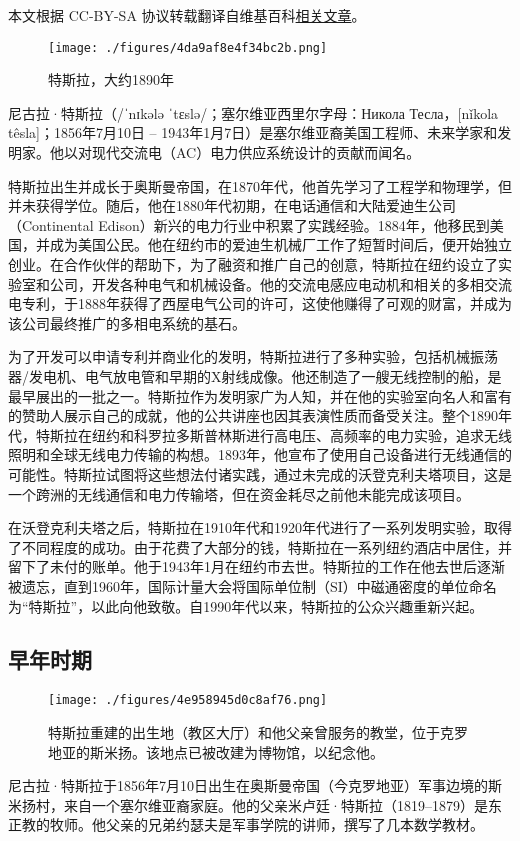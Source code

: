 
本文根据 CC-BY-SA 协议转载翻译自维基百科\href{https://en.wikipedia.org/wiki/Nikola_Tesla}{相关文章}。

\begin{figure}[ht]
\centering
\texttt{[image: ./figures/4da9af8e4f34bc2b.png]}
\caption{特斯拉，大约1890年} \label{fig_Tesla_1}
\end{figure}
尼古拉·特斯拉（/ˈnɪkələ ˈtɛslə/；塞尔维亚西里尔字母：Никола Тесла，[nǐkola têsla]；1856年7月10日 – 1943年1月7日）是塞尔维亚裔美国工程师、未来学家和发明家。他以对现代交流电（AC）电力供应系统设计的贡献而闻名。

特斯拉出生并成长于奥斯曼帝国，在1870年代，他首先学习了工程学和物理学，但并未获得学位。随后，他在1880年代初期，在电话通信和大陆爱迪生公司（Continental Edison）新兴的电力行业中积累了实践经验。1884年，他移民到美国，并成为美国公民。他在纽约市的爱迪生机械厂工作了短暂时间后，便开始独立创业。在合作伙伴的帮助下，为了融资和推广自己的创意，特斯拉在纽约设立了实验室和公司，开发各种电气和机械设备。他的交流电感应电动机和相关的多相交流电专利，于1888年获得了西屋电气公司的许可，这使他赚得了可观的财富，并成为该公司最终推广的多相电系统的基石。

为了开发可以申请专利并商业化的发明，特斯拉进行了多种实验，包括机械振荡器/发电机、电气放电管和早期的X射线成像。他还制造了一艘无线控制的船，是最早展出的一批之一。特斯拉作为发明家广为人知，并在他的实验室向名人和富有的赞助人展示自己的成就，他的公共讲座也因其表演性质而备受关注。整个1890年代，特斯拉在纽约和科罗拉多斯普林斯进行高电压、高频率的电力实验，追求无线照明和全球无线电力传输的构想。1893年，他宣布了使用自己设备进行无线通信的可能性。特斯拉试图将这些想法付诸实践，通过未完成的沃登克利夫塔项目，这是一个跨洲的无线通信和电力传输塔，但在资金耗尽之前他未能完成该项目。

在沃登克利夫塔之后，特斯拉在1910年代和1920年代进行了一系列发明实验，取得了不同程度的成功。由于花费了大部分的钱，特斯拉在一系列纽约酒店中居住，并留下了未付的账单。他于1943年1月在纽约市去世。特斯拉的工作在他去世后逐渐被遗忘，直到1960年，国际计量大会将国际单位制（SI）中磁通密度的单位命名为“特斯拉”，以此向他致敬。自1990年代以来，特斯拉的公众兴趣重新兴起。
\subsection{早年时期}
\begin{figure}[ht]
\centering
\texttt{[image: ./figures/4e958945d0c8af76.png]}
\caption{特斯拉重建的出生地（教区大厅）和他父亲曾服务的教堂，位于克罗地亚的斯米扬。该地点已被改建为博物馆，以纪念他。} \label{fig_Tesla_2}
\end{figure}
尼古拉·特斯拉于1856年7月10日出生在奥斯曼帝国（今克罗地亚）军事边境的斯米扬村，来自一个塞尔维亚裔家庭。他的父亲米卢廷·特斯拉（1819–1879）是东正教的牧师。他父亲的兄弟约瑟夫是军事学院的讲师，撰写了几本数学教材。


